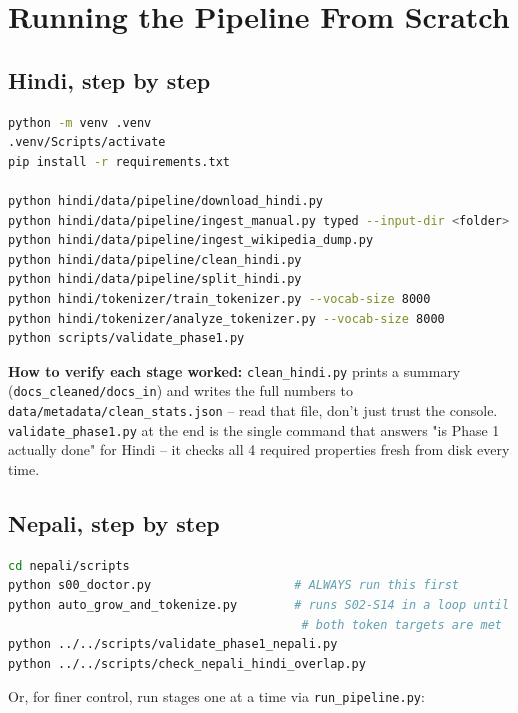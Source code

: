 \documentclass[11pt]{report}
\begin{document}
\chapter{Running the Pipeline From Scratch}

\section{Hindi, step by step}

\begin{lstlisting}[language=bash]
python -m venv .venv
.venv/Scripts/activate
pip install -r requirements.txt

python hindi/data/pipeline/download_hindi.py
python hindi/data/pipeline/ingest_manual.py typed --input-dir <folder>
python hindi/data/pipeline/ingest_wikipedia_dump.py
python hindi/data/pipeline/clean_hindi.py
python hindi/data/pipeline/split_hindi.py
python hindi/tokenizer/train_tokenizer.py --vocab-size 8000
python hindi/tokenizer/analyze_tokenizer.py --vocab-size 8000
python scripts/validate_phase1.py
\end{lstlisting}

\textbf{How to verify each stage worked:} \texttt{clean\_hindi.py} prints
a summary (\texttt{docs\_cleaned/docs\_in}) and writes the full numbers
to \texttt{data/metadata/clean\_stats.json} -- read that file, don't just
trust the console. \texttt{validate\_phase1.py} at the end is the single
command that answers "is Phase 1 actually done" for Hindi -- it checks
all 4 required properties fresh from disk every time.

\section{Nepali, step by step}

\begin{lstlisting}[language=bash]
cd nepali/scripts
python s00_doctor.py                    # ALWAYS run this first
python auto_grow_and_tokenize.py        # runs S02-S14 in a loop until
                                         # both token targets are met
python ../../scripts/validate_phase1_nepali.py
python ../../scripts/check_nepali_hindi_overlap.py
\end{lstlisting}

Or, for finer control, run stages one at a time via
\texttt{run\_pipeline.py}:
\end{document}
